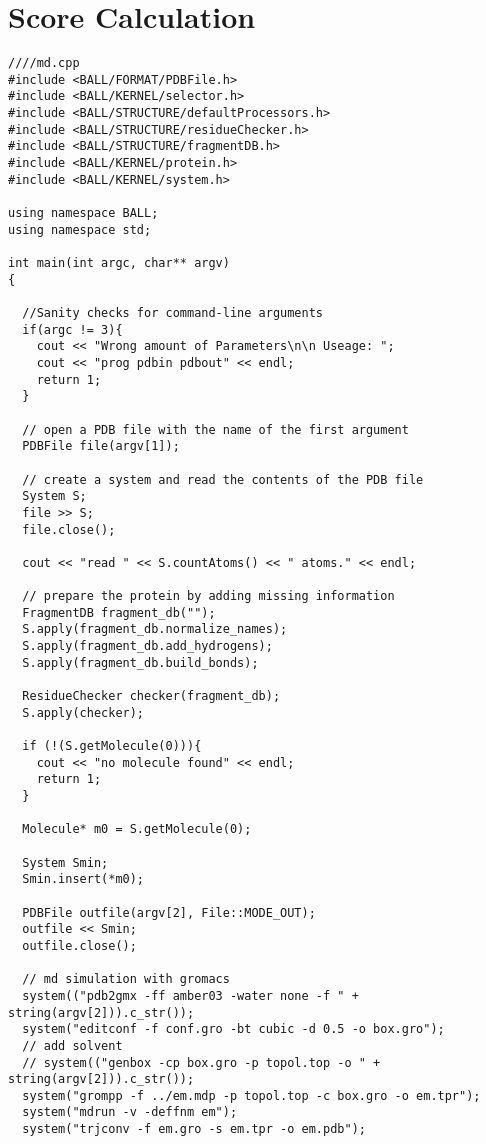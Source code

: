 \documentclass[11pt]{article}
\begin{document}
\section{Score Calculation}
\begin{lstlisting}
////md.cpp
#include <BALL/FORMAT/PDBFile.h>
#include <BALL/KERNEL/selector.h>
#include <BALL/STRUCTURE/defaultProcessors.h>
#include <BALL/STRUCTURE/residueChecker.h>
#include <BALL/STRUCTURE/fragmentDB.h>
#include <BALL/KERNEL/protein.h>
#include <BALL/KERNEL/system.h>

using namespace BALL;
using namespace std;

int main(int argc, char** argv)
{

  //Sanity checks for command-line arguments	
  if(argc != 3){
    cout << "Wrong amount of Parameters\n\n Useage: ";
    cout << "prog pdbin pdbout" << endl;
    return 1;
  }

  // open a PDB file with the name of the first argument
  PDBFile file(argv[1]);

  // create a system and read the contents of the PDB file
  System S;
  file >> S;
  file.close();

  cout << "read " << S.countAtoms() << " atoms." << endl;

  // prepare the protein by adding missing information
  FragmentDB fragment_db("");
  S.apply(fragment_db.normalize_names);
  S.apply(fragment_db.add_hydrogens);  
  S.apply(fragment_db.build_bonds);

  ResidueChecker checker(fragment_db);
  S.apply(checker);

  if (!(S.getMolecule(0))){
    cout << "no molecule found" << endl;
    return 1;
  }

  Molecule* m0 = S.getMolecule(0);

  System Smin;
  Smin.insert(*m0);

  PDBFile outfile(argv[2], File::MODE_OUT);
  outfile << Smin;
  outfile.close();

  // md simulation with gromacs
  system(("pdb2gmx -ff amber03 -water none -f " + string(argv[2])).c_str());
  system("editconf -f conf.gro -bt cubic -d 0.5 -o box.gro");
  // add solvent
  // system(("genbox -cp box.gro -p topol.top -o " + string(argv[2])).c_str());
  system("grompp -f ../em.mdp -p topol.top -c box.gro -o em.tpr");
  system("mdrun -v -deffnm em");
  system("trjconv -f em.gro -s em.tpr -o em.pdb");


\end{lstlisting}
\end{document}
